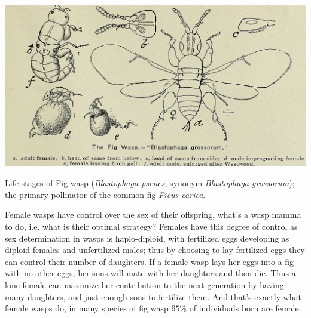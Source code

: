 {\begin{marginfigure}
  \begin{center}
    \includegraphics[width= \textwidth]{illustration_images/single_locus_selection/Fig_wasp/1280px-A_descriptive_catalogue_of_fruit_and_forest_trees_vines_and_shrubs_choice_palms_and_roses.jpg}
\end{center}  %
\caption{
Life stages of Fig wasp ({\it Blastophaga psenes}, synonym {\it Blastophaga
    grossorum}); the primary pollinator of the common fig {\it Ficus carica}.
} \label{fig:fig_wasp}
\end{marginfigure}

Female wasps have control over the sex of their offspring, what's a
wasp mamma to do, i.e. what is their optimal strategy? Females have
this degree of control as sex determination in wasps is haplo-diploid, with fertilized eggs
developing as diploid females and unfertilized males; thus by choosing
to lay fertilized eggs they can control their number of daughters. 
If a female wasp lays her eggs into a fig with no other eggs, her sons
will mate with her daughters and then die. Thus a lone female can maximize
her contribution to the next generation by having many daughters, and
just enough sons to fertilize them. And that's exactly what female
wasps do, in many species of fig wasp $95\%$ of individuals born are
female. 


}
